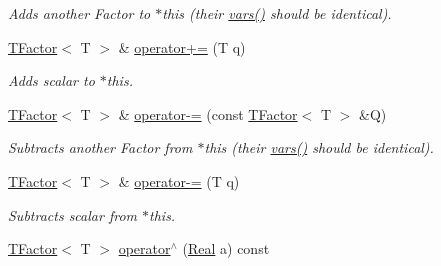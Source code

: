 \begin{CompactItemize}
\begin{CompactList}\small\item\em Adds another Factor to $\ast$this (their \hyperlink{classdai_1_1TFactor_54c575d53b8c8a6a03c26c8cdc600ce4}{vars()} should be identical). \item\end{CompactList}\item 
\hypertarget{classdai_1_1TFactor_fda1418de5d67a6ba004eaea3ef66f77}{
\hyperlink{classdai_1_1TFactor}{TFactor}$<$ T $>$ \& \hyperlink{classdai_1_1TFactor_fda1418de5d67a6ba004eaea3ef66f77}{operator+=} (T q)}
\label{classdai_1_1TFactor_fda1418de5d67a6ba004eaea3ef66f77}

\begin{CompactList}\small\item\em Adds scalar to $\ast$this. \item\end{CompactList}\item 
\hypertarget{classdai_1_1TFactor_a6dd7ae3384f6f329e2cb3c3fa31e514}{
\hyperlink{classdai_1_1TFactor}{TFactor}$<$ T $>$ \& \hyperlink{classdai_1_1TFactor_a6dd7ae3384f6f329e2cb3c3fa31e514}{operator-=} (const \hyperlink{classdai_1_1TFactor}{TFactor}$<$ T $>$ \&Q)}
\label{classdai_1_1TFactor_a6dd7ae3384f6f329e2cb3c3fa31e514}

\begin{CompactList}\small\item\em Subtracts another Factor from $\ast$this (their \hyperlink{classdai_1_1TFactor_54c575d53b8c8a6a03c26c8cdc600ce4}{vars()} should be identical). \item\end{CompactList}\item 
\hypertarget{classdai_1_1TFactor_d74386483d4f28011ddc962db443e3aa}{
\hyperlink{classdai_1_1TFactor}{TFactor}$<$ T $>$ \& \hyperlink{classdai_1_1TFactor_d74386483d4f28011ddc962db443e3aa}{operator-=} (T q)}
\label{classdai_1_1TFactor_d74386483d4f28011ddc962db443e3aa}

\begin{CompactList}\small\item\em Subtracts scalar from $\ast$this. \item\end{CompactList}\item 
\hypertarget{classdai_1_1TFactor_9b87c70ab153534d5cdbbdba6aaa7921}{
\hyperlink{classdai_1_1TFactor}{TFactor}$<$ T $>$ \hyperlink{classdai_1_1TFactor_9b87c70ab153534d5cdbbdba6aaa7921}{operator$^\wedge$} (\hyperlink{namespacedai_e7d0472fdc89a8635825d01940e91cbf}{Real} a) const }
\label{classdai_1_1TFactor_9b87c70ab153534d5cdbbdba6aaa7921}


\end{CompactItemize}
